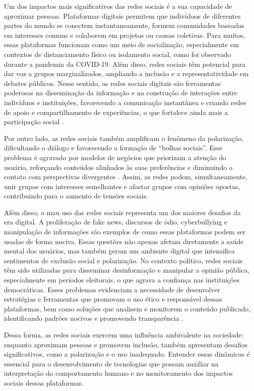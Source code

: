 \documentclass[
	12pt,				%
	oneside,			%
	a4paper,			%
	english,			%
	french,				%
	spanish,			%
	brazil				%
	]{abntex2}
\begin{document}
Um dos impactos mais significativos das redes sociais é a sua capacidade
de aproximar pessoas. Plataformas digitais permitem que indivíduos de
diferentes partes do mundo se conectem instantaneamente, formem
comunidades baseadas em interesses comuns e colaborem em projetos ou
causas coletivas. Para muitos, essas plataformas funcionam como um meio
de socialização, especialmente em contextos de distanciamento físico ou
isolamento social, como foi observado durante a pandemia da COVID-19.
Além disso, redes sociais têm potencial para dar voz a grupos
marginalizados, ampliando a inclusão e a representatividade em debates
públicos. Nesse sentido, as redes sociais digitais são ferramentas
poderosas na disseminação da informação e na construção de interações
entre indivíduos e instituições, favorecendo a comunicação instantânea e
criando redes de apoio e compartilhamento de experiências, o que
fortalece ainda mais a participação social \cite{lima2021redes}.

Por outro lado, as redes sociais também amplificam o fenômeno da
polarização, dificultando o diálogo e favorecendo a formação de ``bolhas
sociais''. Esse problema é agravado por modelos de negócios que
priorizam a atenção do usuário, reforçando conteúdos alinhados às suas
preferências e diminuindo o contato com perspectivas divergentes
\cite{de2020democracia}​. Assim, as redes podem, simultaneamente, unir
grupos com interesses semelhantes e afastar grupos com opiniões opostas,
contribuindo para o aumento de tensões sociais.

Além disso, o mau uso das redes sociais representa um dos maiores
desafios da era digital. A proliferação de fake news, discursos de ódio,
cyberbullying e manipulação de informações são exemplos de como essas
plataformas podem ser usadas de forma nociva. Essas questões não apenas
afetam diretamente a saúde mental dos usuários, mas também geram um
ambiente digital que intensifica sentimentos de exclusão social e
polarização. No contexto político, redes sociais têm sido utilizadas
para disseminar desinformação e manipular a opinião pública,
especialmente em períodos eleitorais, o que agrava a confiança nas
instituições democráticas. Esses problemas evidenciam a necessidade de
desenvolver estratégias e ferramentas que promovam o uso ético e
responsável dessas plataformas, bem como soluções que analisem e
monitorem o conteúdo publicado, identificando padrões nocivos e
promovendo transparência \cite{siqueira2024impacto}.

Dessa forma, as redes sociais exercem uma influência ambivalente na
sociedade: enquanto aproximam pessoas e promovem inclusão, também
apresentam desafios significativos, como a polarização e o uso
inadequado. Entender essas dinâmicas é essencial para o desenvolvimento
de tecnologias que possam auxiliar na interpretação do comportamento
humano e no monitoramento dos impactos sociais dessas plataformas.
\end{document}
